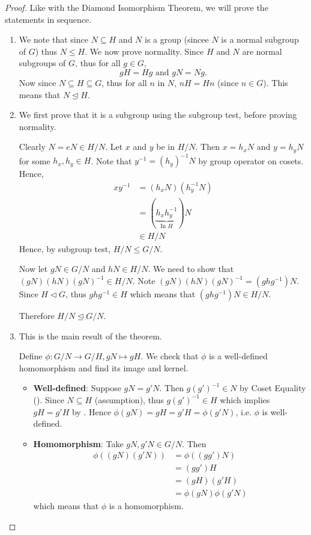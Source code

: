 \begin{proof}
    Like with the Diamond Isomorphism Theorem, we will prove the statements in sequence.

    \newpage

    \begin{enumerate}
        \item We note that since $N \subseteq H$ and $N$ is a group (sincee $N$ is a normal subgroup of $G$) thus $N \leq H$. We now prove normality. Since $H$ and $N$ are normal subgroups of $G$, thus for all $g \in G$,
        \[
            gH = Hg \text{ and } gN = Ng.
        \]
        Now since $N \subseteq H \subseteq G$, thus for all $n$ in $N$, $nH = Hn$ (since $n \in G$). This means that $N \unlhd H$.

        \item We first prove that it is a subgroup using the subgroup test, before proving normality.

        Clearly $N = eN \in H/N$. Let $x$ and $y$ be in $H/N$. Then $x=h_xN$ and $y=h_yN$ for some $h_x, h_y \in H$. Note that $y^{-1} = (h_y)^{-1}N$ by group operator on cosets. Hence,
        \begin{align*}
            xy^{-1} &= (h_xN)(h_y^{-1}N)\\
            &= (\underbrace{h_xh_y^{-1}}_{\text{In }H})N\\
            &\in H/N
        \end{align*}
        Hence, by subgroup test, $H/N \leq G/N$.

        Now let $gN \in G/N$ and $hN \in H/N$. We need to show that $(gN)(hN)(gN)^{-1} \in H/N$. Note $(gN)(hN)(gN)^{-1} = (ghg^{-1})N$. Since $H \lhd G$, thus $ghg^{-1} \in H$ which means that $(ghg^{-1})N \in H/N$.

        Therefore $H/N \unlhd G/N$.

        \item This is the main result of the theorem.

        Define $\phi: G/N \to G/H, gN \mapsto gH$. We check that $\phi$ is a well-defined homomorphism and find its image and kernel.
        \begin{itemize}
            \item \textbf{Well-defined}: Suppose $gN = g'N$. Then $g(g')^{-1} \in N$ by Coset Equality (). Since $N \subseteq H$ (assumption), thus $g(g')^{-1} \in H$ which implies $gH = g'H$ by . Hence $\phi(gN) = gH = g'H = \phi(g'N)$, i.e. $\phi$ is well-defined.
            \item \textbf{Homomorphism}: Take $gN, g'N \in G/N$. Then
            \begin{align*}
                \phi((gN)(g'N)) &= \phi((gg')N)\\
                &= (gg')H\\
                &= (gH)(g'H)\\
                &= \phi(gN)\phi(g'N)
            \end{align*}
            which means that $\phi$ is a homomorphism.
            

\end{itemize}
\end{enumerate}
\end{proof}
